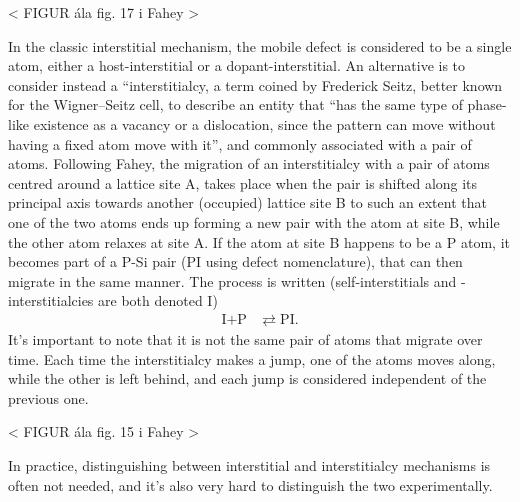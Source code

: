 \documentclass[11pt,bibliography=totoc,index=totoc]{scrbook}   %
\begin{document}
< FIGUR ála fig. 17 i Fahey >

In the classic interstitial mechanism, the mobile defect is considered to be a single atom, either a host-interstitial or a dopant-interstitial. 
An alternative is to consider instead a ``interstitialcy, a term coined by Frederick Seitz, better known for the Wigner–Seitz cell, to describe an entity that ``has the same type of phase-like existence as a vacancy or a dislocation, since the pattern can move without having a fixed atom move with it'',\cite{Seitz:1950} 
and commonly associated with a pair of atoms.
Following Fahey,\cite[322]{Fahey:1989} the migration of an interstitialcy with a pair of atoms centred around a lattice site A, takes place when the pair is shifted along its principal axis towards another (occupied) lattice site B to such an extent that one of the two atoms ends up forming a new pair with the atom at site B, while the other atom relaxes at site A. 
If the atom at site B happens to be a P atom, it becomes part of a P-Si pair (PI using defect nomenclature), 
that can then migrate in the same manner.
The process is written (self-interstitials and -interstitialcies are both denoted I)
\begin{align*}
    \text{I} + \text{P} &\rightleftarrows \text{PI}.
\end{align*}
It's important to note that it is not the same pair of atoms that migrate over time.
Each time the interstitialcy makes a jump, one of the atoms moves along, while the other is left behind,
and each jump is considered independent of the previous one.\cite[323]{Fahey:1989}

< FIGUR ála fig. 15 i Fahey >

In practice, distinguishing between interstitial and interstitialcy mechanisms is often not needed, and it's also very hard to distinguish the two experimentally.\cite[295]{Fahey:1989}
\end{document}
